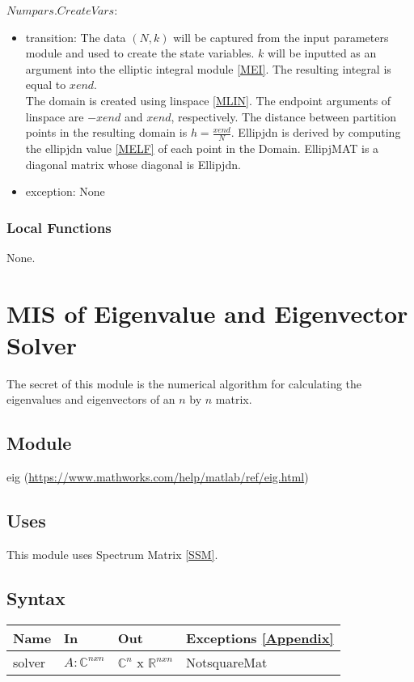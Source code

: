 \documentclass[12pt, titlepage]{article}
\begin{document}
\noindent $Numpars.CreateVars$:
\begin{itemize}
	\item transition: The data $(N,k)$ will be captured from the input 
	parameters module and used to create the state variables. $k$ will be 
	inputted as 
	an argument into the elliptic integral module \ref{MEI}. The resulting 
	integral is 
	equal to $xend$. \\ 
	The domain is created using linspace \ref{MLIN}. The endpoint arguments of 
	linspace 
	are $-xend$ and $xend$, respectively. The distance between partition points 
	in the resulting domain is $h=\frac{xend}{N}$. Ellipjdn is derived by 
	computing the ellipjdn value \ref{MELF} of each point in the Domain. 
	EllipjMAT is a 
	diagonal matrix whose diagonal is Ellipjdn. 
	\item exception: None
\end{itemize} 

\subsubsection{Local Functions} 

None. 

\newpage

\section{MIS of Eigenvalue and Eigenvector Solver} \label{SEES}

The secret of this module is the numerical algorithm for calculating the 
eigenvalues and eigenvectors of an $n$ by $n$ matrix.

\subsection{Module}

eig (\url{https://www.mathworks.com/help/matlab/ref/eig.html})

\subsection{Uses}

This module uses Spectrum Matrix \ref{SSM}. 

\subsection{Syntax}

\begin{center}
	\begin{tabular}{p{2cm} p{4cm} p{4cm} p{4cm}}
		\hline
		\textbf{Name} & \textbf{In} & \textbf{Out} & \textbf{Exceptions} 
		\ref{Appendix} \\
		\hline
		solver & $A : \mathbb{C}^{nxn}$  & 
		$\mathbb{C}^{n}$ x $\mathbb{R}^{nxn}$ & NotsquareMat \\
		\hline
	\end{tabular}
\end{center}
\end{document}
